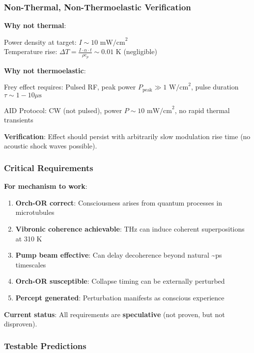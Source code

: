 \subsubsection{Non-Thermal, Non-Thermoelastic
Verification}\label{non-thermal-non-thermoelastic-verification}

\textbf{Why not thermal}:

Power density at target: \(I \sim 10 \text{ mW/cm}^2\)\\
Temperature rise:
\(\Delta T = \frac{I \cdot \alpha \cdot t}{\rho c_p} \sim 0.01 \text{ K}\)
(negligible)

\textbf{Why not thermoelastic}:

Frey effect requires: Pulsed RF, peak power
\(P_{\text{peak}} \gg 1 \text{ W/cm}^2\), pulse duration
\(\tau \sim 1-10 \mu\text{s}\)

AID Protocol: CW (not pulsed), power \(P \sim 10 \text{ mW/cm}^2\), no
rapid thermal transients

\textbf{Verification}: Effect should persist with arbitrarily slow
modulation rise time (no acoustic shock waves possible).

\subsubsection{Critical Requirements}\label{critical-requirements}

\textbf{For mechanism to work}:

\begin{enumerate}
\def\labelenumi{\arabic{enumi}.}
\tightlist
\item
  \textbf{Orch-OR correct}: Consciousness arises from quantum processes
  in microtubules
\item
  \textbf{Vibronic coherence achievable}: THz can induce coherent
  superpositions at 310 K
\item
  \textbf{Pump beam effective}: Can delay decoherence beyond natural
  \textasciitilde ps timescales
\item
  \textbf{Orch-OR susceptible}: Collapse timing can be externally
  perturbed
\item
  \textbf{Percept generated}: Perturbation manifests as conscious
  experience
\end{enumerate}

\textbf{Current status}: All requirements are \textbf{speculative} (not
proven, but not disproven).

\subsubsection{Testable Predictions}\label{testable-predictions}


